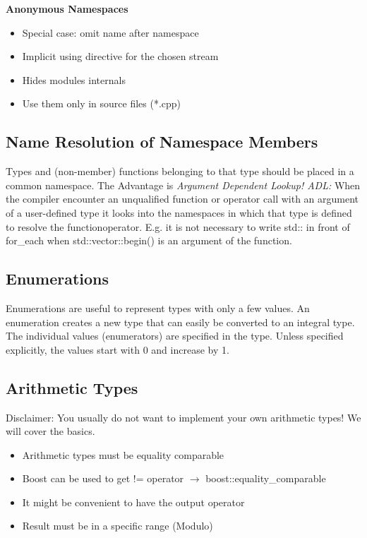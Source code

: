 \textbf{Anonymous Namespaces}
\begin{itemize}
  \itemsep -0.5em 
  \item Special case: omit name after namespace
  \item Implicit using directive for the chosen stream
  \item Hides modules internals
  \item Use them only in source files (*.cpp)
\end{itemize}


\subsection{Name Resolution of Namespace Members}
Types and (non-member) functions belonging to that type should be placed in a common namespace. The Advantage is \textit{Argument Dependent Lookup! ADL:} When the compiler encounter an unqualified function or operator call with an argument of a user-defined type it looks into the namespaces in which that type is defined to resolve the function\/operator. E.g. it is not necessary to write std:: in front of for\_each when std::vector::begin() is an argument of the function.


\subsection{Enumerations}
Enumerations are useful to represent types with only a few values. An enumeration creates a new type that can easily be converted to an integral type.  The individual values (enumerators) are specified in the type. Unless specified explicitly, the values start with 0 and increase by 1.


\subsection{Arithmetic Types}
Disclaimer: You usually do not want to implement your own arithmetic types! We will cover the basics.

\begin{itemize}
	\itemsep -0.5em
    \item Arithmetic types must be equality comparable
    \item Boost can be used to get != operator $\rightarrow$ boost::equality\_comparable
    \item It might be convenient to have the output operator
    \item Result must be in a specific range (Modulo)
\end{itemize}
\vspace{0.3cm}


